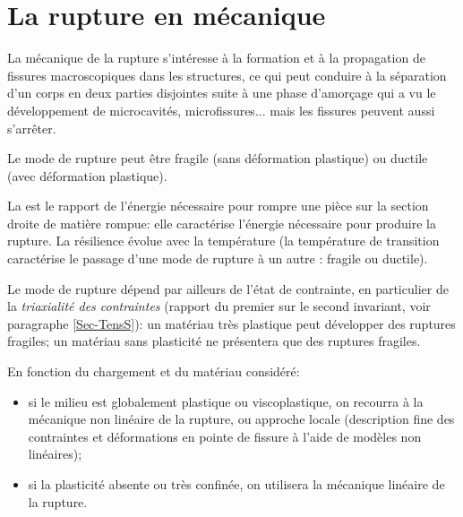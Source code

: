 \chapter{La rupture en mécanique}\label{Ch-rupt}

La mécanique de la rupture s'intéresse à la formation et à la propagation de fissures
macroscopiques dans les structures, ce qui peut conduire à la séparation d'un corps en deux 
parties disjointes suite à une phase d'amorçage qui a vu le développement de microcavités, 
microfissures... mais les fissures peuvent aussi s'arrêter.

Le mode de rupture peut être fragile (sans déformation plastique) ou ductile (avec déformation
plastique).

\medskip
La  est le rapport de l'énergie nécessaire pour rompre une pièce sur la 
section droite de matière rompue: elle caractérise l'énergie nécessaire pour produire la rupture.
La résilience évolue avec la température (la température de transition caractérise le passage
d'une mode de rupture à un autre : fragile ou ductile).

Le mode de rupture dépend par ailleurs de l'état de contrainte, en particulier de la \emph{triaxialité
des contraintes} (rapport du premier sur le second invariant, voir paragraphe \ref{Sec-TensS}):
un matériau très plastique peut développer des ruptures fragiles; un matériau sans plasticité
ne présentera que des ruptures fragiles.

\medskip
En fonction du chargement et du matériau considéré:
\begin{itemize}
   \item si le milieu est globalement plastique ou viscoplastique, on recourra à la mécanique 
	non linéaire de la rupture, ou approche locale (description fine des contraintes et déformations 
	en pointe de fissure à l'aide de modèles non linéaires);
   \item si la plasticité absente ou très confinée, on utilisera la mécanique linéaire de la rupture.
\end{itemize}

%
%





